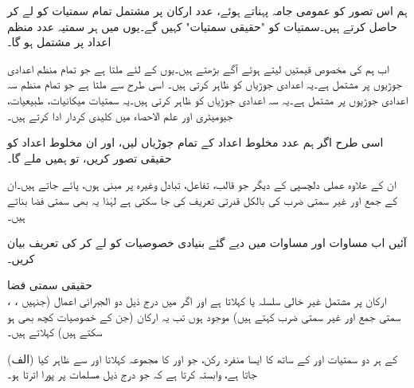 ہم اس تصور کو عمومی جامہ پہناتے ہوئے،  عدد ارکان پر مشتمل تمام سمتیات کو لے کر   حاصل کرتے ہیں۔سمتیات کو "حقیقی سمتیات" کہیں گے۔یوں  میں ہر سمتیہ  عدد منظم اعداد پر مشتمل ہو گا۔

اب ہم  کی مخصوص قیمتیں لیتے ہوئے آگے بڑھتے ہیں۔یوں  کے لئے  ملتا ہے جو تمام منظم اعدادی جوڑیوں پر مشتمل ہے۔یہ اعدادی جوڑیاں  کو ظاہر کرتی ہیں۔ اسی طرح  سے  ملتا ہے جو  تمام منظم سہ اعدادی جوڑیوں پر مشتمل ہے۔یہ سہ اعدادی جوڑیاں  کو ظاہر کرتی ہیں۔یہ سمتیات میکانیات، طبیعیات، جیومیٹری اور علم الاحصاء میں کلیدی کردار ادا کرتے ہیں۔

اسی طرح اگر ہم   عدد مخلوط اعداد کے تمام جوڑیاں لیں، اور ان مخلوط اعداد کو حقیقی تصور کریں، تو ہمیں   ملے گا۔ 

ان کے علاوہ عملی دلچسپی کے دیگر   جو قالب، تفاعل، تبادل وغیرہ پر مبنی ہوں، پائے جاتے ہیں۔ان کے جمع اور غیر سمتی ضرب کی بالکل قدرتی تعریف کی جا سکتی ہے لہٰذا یہ بھی سمتی فضا بناتے ہیں۔     

آئیں اب مساوات  اور مساوات  میں دیے گئے  بنیادی خصوصیات کو لے کر   کی تعریف بیان کریں۔

\quad حقیقی سمتی فضا\\
، ،  ارکان پر مشتمل غیر خالی سلسلہ   یا  کہلاتا ہے اور اگر  میں درج ذیل دو الجبرائی اعمال (جنہیں سمتی جمع اور غیر سمتی ضرب کہتے ہیں) موجود ہوں تب یہ ارکان (جن کے خصوصیات کچھ بھی ہو سکتے ہیں)   کہلاتے ہیں۔

(الف)\quad {}  کے ہر دو سمتیات  اور  کے ساتھ  کا ایسا منفرد رکن، جو  اور  کا مجموعہ کہلاتا  اور  سے ظاہر کیا جاتا ہے،  وابستہ  کرتا ہے کہ جو درج ذیل مسلمات پر پورا اترتا ہو۔

